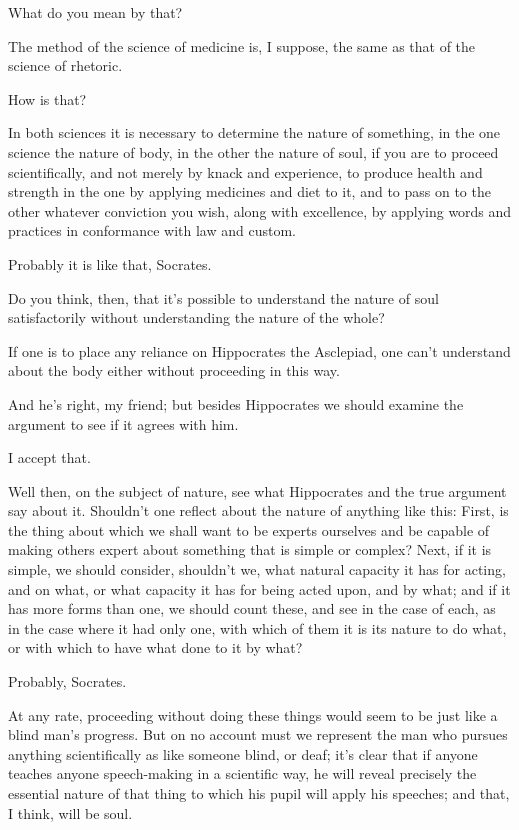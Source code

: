 What do you mean by that?

 The method of the science of medicine is, I suppose,
the same as that of the science of rhetoric.

How is that?

In both sciences it is necessary to determine the 
nature of something, in the one science the nature of body, in the other
the nature of soul, if you are to proceed scientifically, and not merely
by knack and experience,
to produce health and strength in the one by applying medicines and diet
to it, and to pass on to the other whatever conviction you wish, along
with excellence, by applying
words and practices in
conformance with law and custom.

 Probably it is like that, Socrates.

 Do you think, then, that it's possible to understand
the nature of soul satisfactorily without understanding the nature of
the whole?

If one is to place any reliance on Hippocrates the
Asclepiad, one can't
understand about the body either  without proceeding in this
way.

And he's right, my friend; but besides Hippocrates we should
examine the argument to
see if it agrees with him.

I accept that.

Well then, on the subject of nature, see what 
Hippocrates and the true argument say about it. Shouldn't one 
reflect about the nature of anything like this: First, is the thing
about which we shall want to be experts ourselves and be capable of
making others expert about something that is simple or complex? Next, if
it is simple, we should consider, shouldn't  we, what natural
capacity it has for acting, and on what, or what capacity it has for
being acted upon, and by what; and if it has more
forms than one, we
should count these, and see in the case of each, as in the case where it
had only one, with which of them it is its nature to do what, or with
which to have what done to it by what?

Probably, Socrates.

At any rate, proceeding without doing these things would seem
to be just like a blind man's progress. But on no  account must
we represent the man who pursues anything scientifically as like someone
blind, or deaf; it's clear that if anyone teaches anyone speech-making
in a scientific way, he will reveal precisely the essential nature of
that thing to which his pupil will apply his speeches; and that, I
think, will be soul. 

